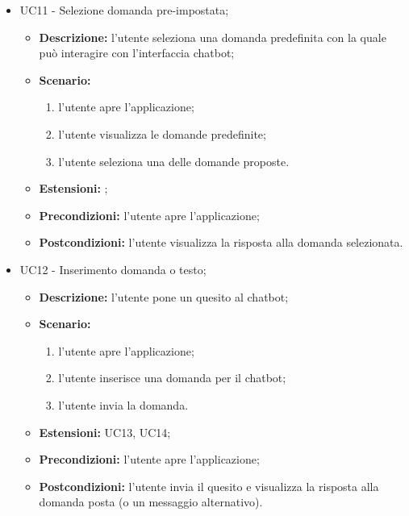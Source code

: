 \documentclass[10pt, a4paper]{article}
\begin{document}
\begin{itemize}
    \item UC11 - Selezione domanda pre-impostata;
    \begin{itemize}
        \item \textbf{Descrizione: }l'utente seleziona una domanda predefinita con la quale può interagire con l'interfaccia chatbot;
        \item \textbf{Scenario: }
        \begin{enumerate}[label={\arabic*.}, align=left]
        \item l'utente apre l'applicazione;
        \item l'utente visualizza le domande predefinite;
        \item l'utente seleziona una delle domande proposte.
        \end{enumerate}
        \item \textbf{Estensioni: };
        \item \textbf{Precondizioni:} l'utente apre l'applicazione;
        \item \textbf{Postcondizioni:} l'utente visualizza la risposta alla domanda selezionata.\\
    \end{itemize}
    
    \item UC12 - Inserimento domanda o testo;
    \begin{itemize}
        \item \textbf{Descrizione: }l'utente pone un quesito al chatbot;
        \item \textbf{Scenario: }
        \begin{enumerate}[label={\arabic*.}, align=left]
        \item l'utente apre l'applicazione;
        \item l'utente inserisce una domanda per il chatbot;
        \item l'utente invia la domanda.
        \end{enumerate}
        \item \textbf{Estensioni: }UC13, UC14;
        \item \textbf{Precondizioni:} l'utente apre l'applicazione;
        \item \textbf{Postcondizioni: }l'utente invia il quesito e visualizza la risposta alla domanda posta (o un messaggio alternativo).\\
    \end{itemize}


\end{itemize}
\end{document}
